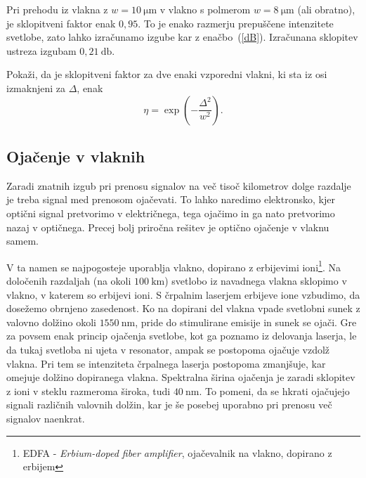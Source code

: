 Pri prehodu iz vlakna z $w = 10~\si{\micro\meter}$ v vlakno
s polmerom $w = 8~\si{\micro\meter}$ (ali obratno), je sklopitveni faktor enak $0,95$. 
To je enako razmerju prepuščene intenzitete svetlobe, zato lahko izračunamo izgube kar z
enačbo~(\ref{dB}). Izračunana sklopitev ustreza izgubam $0,21~\si{\decibel}$. 

\begin{definition}
Pokaži, da je sklopitveni faktor za dve enaki vzporedni vlakni, ki sta iz osi izmaknjeni
za $\Delta$, enak
\begin{equation}
\eta = \exp \left( - \frac{\Delta^2}{w^2}\right).
\end{equation}

\end{definition}

\subsection*{Ojačenje v vlaknih}
Zaradi znatnih izgub pri prenosu signalov na več tisoč kilometrov dolge razdalje 
je treba signal med prenosom ojačevati. To lahko naredimo elektronsko, kjer optični signal 
pretvorimo v električnega, tega ojačimo in ga nato pretvorimo nazaj v optičnega. 
Precej bolj priročna rešitev je optično ojačenje v vlaknu samem. 

V ta namen se najpogosteje uporablja vlakno, dopirano z erbijevimi 
ioni\footnote{EDFA - {\it Erbium-doped fiber amplifier}, 
ojačevalnik na vlakno, dopirano z erbijem}. 
Na določenih razdaljah (na okoli $100~\si{\kilo\meter}$) svetlobo iz navadnega vlakna 
sklopimo v vlakno, v katerem so erbijevi ioni.
S črpalnim laserjem erbijeve ione vzbudimo, da dosežemo obrnjeno zasedenost. 
Ko na dopirani del vlakna vpade svetlobni sunek z valovno dolžino okoli 
$1550~\si{\nano\meter}$, pride do stimulirane emisije in 
sunek se ojači. Gre za povsem enak princip ojačenja svetlobe, kot ga poznamo iz 
delovanja laserja, le da tukaj svetloba ni ujeta v resonator, ampak se postopoma 
ojačuje vzdolž vlakna. Pri tem se intenziteta črpalnega laserja postopoma zmanjšuje,
kar omejuje dolžino dopiranega vlakna.
Spektralna širina ojačenja je zaradi sklopitev z ioni v steklu 
razmeroma široka, tudi $40~\si{\nano\meter}$. To pomeni, da se hkrati ojačujejo signali različnih 
valovnih dolžin, kar je še posebej uporabno pri prenosu več signalov naenkrat.

